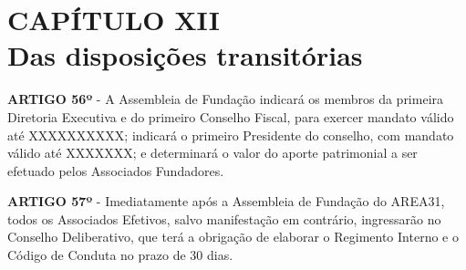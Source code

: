 \chapter*{CAPÍTULO XII \\ Das disposições transitórias}

\textbf{ARTIGO 56º} - A Assembleia de Fundação indicará os membros da 
primeira Diretoria Executiva e do primeiro Conselho Fiscal, para exercer 
mandato válido até XXXXXXXXXX; indicará o primeiro Presidente do conselho, 
com mandato válido até XXXXXXX; e determinará o valor do aporte 
patrimonial a ser efetuado pelos Associados Fundadores.

\bigskip

\textbf{ARTIGO 57º} - Imediatamente após a Assembleia de Fundação do AREA31, 
todos os Associados Efetivos, salvo manifestação em contrário, ingressarão 
no Conselho Deliberativo, que terá a obrigação de elaborar o Regimento 
Interno e o Código de Conduta no prazo de 30 dias.
